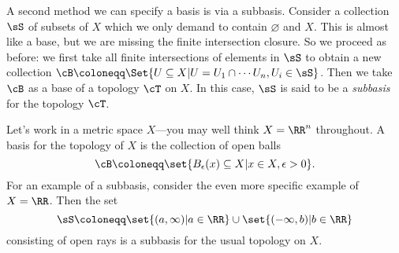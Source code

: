 \documentclass{axolotl}
\begin{document}
A second method we can specify a basis is via a subbasis. Consider a collection
\(\sS\) of subsets of \(X\) which we only demand to contain \(\varnothing\) and
\(X\). This is almost like a base, but we are missing the finite intersection closure.
So we proceed as before: we first take all finite intersections of elements in \(\sS\)
to obtain a new collection \(\cB \coloneqq \Set{U \subseteq X | U = U_1 \cap
    \cdots U_n, U_i \in \sS}\). Then we take \(\cB\) as a base of a topology
\(\cT\) on \(X\). In this case, \(\sS\) is said to be a \textit{subbasis} for
the topology \(\cT\).

Let's work in a metric space \(X\)---you may well think \(X = \RR^n\) throughout.
A basis for the topology of \(X\) is the collection of open balls
\[ \cB \coloneqq \set{B_\epsilon(x) \subseteq X | x \in X, \epsilon > 0}. \]
For an example of a subbasis, consider the even more specific example of \(X = \RR\).
Then the set
\[ \sS \coloneqq \set{(a,\infty) | a \in \RR} \cup \set{(-\infty,b) | b \in \RR} \]
consisting of open rays is a subbasis for the usual topology on \(X\).
\end{document}
